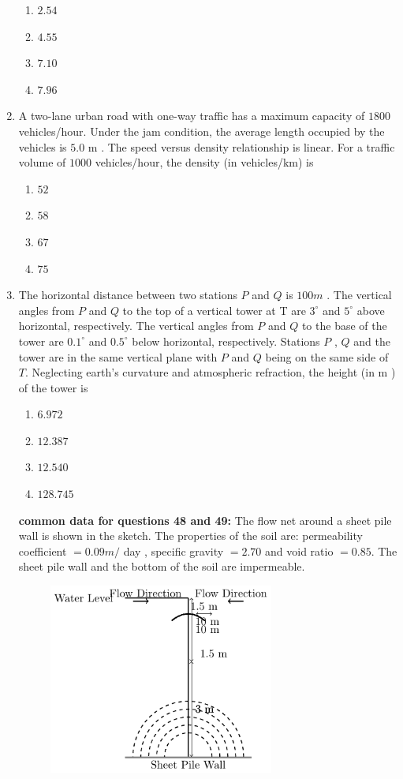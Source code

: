 \documentclass[journal]{IEEEtran}
\begin{document}
\begin{enumerate}
\begin{enumerate}
			\item $2.54$
			\item $4.55$
			\item $7.10$ 
			\item $7.96$ 
        	\end{enumerate}
	\item A two-lane urban road with one-way traffic has a maximum capacity of $1800$ vehicles/hour. Under the jam condition, the average length occupied by the vehicles is $5.0$ m . The speed versus density relationship is linear. For a traffic volume of $1000$ vehicles/hour, the density (in vehicles/km) is
		\begin{enumerate}
		       \item $52$
		       \item $58$
		       \item $67$
		       \item $75$
        	\end{enumerate}	
	\item The horizontal distance between two stations $P$ and $Q$ is $100 m$ . The vertical angles from $P$ and $Q$ to the top of a vertical tower at T are $3^{\circ}$ and $5^{\circ}$ above horizontal, respectively. The vertical angles from $P$ and $Q$ to the base of the tower are $0.1^{\circ}$ and $0.5^{\circ}$ below horizontal, respectively. Stations $P$ , $Q$ and the tower are in the same vertical plane with $P$ and $Q$ being on the same side of $T$. Neglecting earth's curvature and atmospheric refraction, the height (in m ) of the tower is
		\begin{enumerate}
			\item $6.972$
            \item $12.387$
            \item $12.540$
            \item $128.745$
        	\end{enumerate}	
    \textbf{common data for questions 48 and 49:}
    The flow net around a sheet pile wall is shown in the sketch. The properties of the soil are: permeability coefficient $=0.09 m /$ day , specific gravity $=2.70$ and void ratio $=0.85$. The sheet pile wall and the bottom of the soil are impermeable.

\begin{figure}[h!]
    \centering
    \includegraphics[width=0.7\textwidth]{fig/fig1.pdf}
\end{figure}
    

\end{enumerate}
\end{document}
